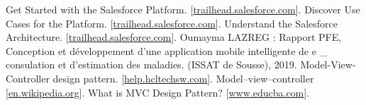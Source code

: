 \documentclass[12pt, oneside, a4paper]{enis-pfe-report}
\begin{document}
  \begin{thebibliography}{9}
Get Started with the Salesforce Platform.
[\href{https://trailhead.salesforce.com/content/learn/modules/starting_force_com/starting_intro}{trailhead.salesforce.com}].
Discover Use Cases for the Platform.
[\href{https://trailhead.salesforce.com/content/learn/modules/starting_force_com/starting_discovering}{trailhead.salesforce.com}].
Understand the Salesforce Architecture.
[\href{https://trailhead.salesforce.com/content/learn/modules/starting_force_com/starting_understanding_arch}{trailhead.salesforce.com}].
Oumayma LAZREG : Rapport PFE, Conception et développement
d'une application mobile
intelligente de e \_ consulation et
d'estimation des maladies.
(ISSAT de Sousse), 2019.
Model-View-Controller design pattern.
[\href{https://help.hcltechsw.com/commerce/9.1.0/developer/concepts/csdmvcdespat.html}{help.hcltechsw.com}].
Model–view–controller
[\href{https://en.wikipedia.org/wiki/Model-view-controller}{en.wikipedia.org}].
What is MVC Design Pattern?
[\href{https://www.educba.com/what-is-mvc-design-pattern/}{www.educba.com}].



\end{thebibliography}
\end{document}
